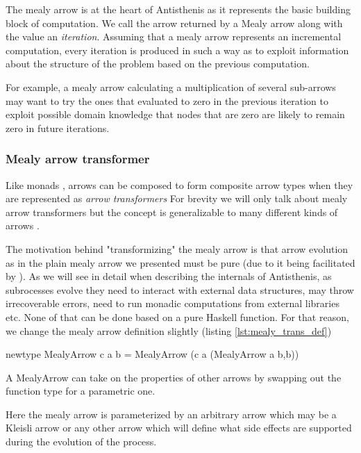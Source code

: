 The mealy arrow is at the heart of Antisthenis as it represents the
basic building block of computation. We call the arrow returned by a
Mealy arrow along with the value an \emph{iteration}. Assuming that a
mealy arrow represents an incremental computation, every iteration is
produced in such a way as to exploit information about the structure
of the problem based on the previous computation.

For example, a mealy arrow calculating a multiplication of several
sub-arrows may want to try the ones that evaluated to zero in the
previous iteration to exploit possible domain knowledge that
nodes that are zero are likely to remain zero in future iterations.

\subsubsection{Mealy arrow transformer}

Like monads \cite{liangMonadTransformersModular1995} , arrows can be
composed to form composite arrow types when they are represented as
\emph{arrow transformers} For brevity we will only talk about mealy
arrow transformers but the concept is generalizable to many different
kinds of arrows \cite{keidelSoundReusableComponents2019a}.

The motivation behind "transformizing" the mealy arrow is that arrow
evolution as in the plain mealy arrow we presented must be pure (due
to it being facilitated by \hask{->}). As we will see in detail when
describing the internals of Antisthenis, as subrocesses evolve they
need to interact with external data structures, may throw
irrecoverable errors, need to run monadic computations from external
libraries etc. None of that can be done based on a pure Haskell
function. For that reason, we change the mealy arrow definition
slightly (listing \ref{lst:mealy_trans_def})

\begin{code}
\begin{haskellcode}
newtype MealyArrow c a b =
  MealyArrow (c a (MealyArrow a b,b))
\end{haskellcode}
  \caption{\label{lst:mealy_trans_def}A MealyArrow can take on the
    properties of other arrows by swapping out the function \hask{->}
    type for a parametric one.}
\end{code}

Here the mealy arrow is parameterized by an arbitrary arrow 
which may be a Kleisli arrow or any other arrow which will define what
side effects are supported during the evolution of the process.

